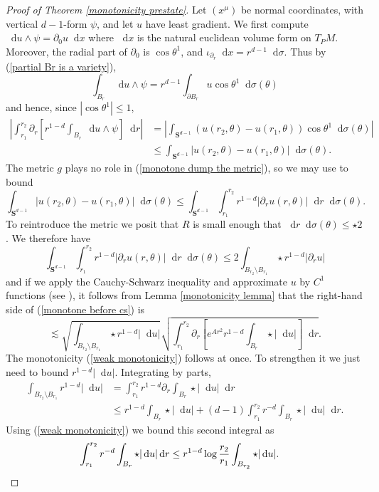 \documentclass[reqno,10pt]{amsart}
\newcommand{\Sph}{\mathbf S}
\newcommand*\dif{\mathop{}\!\mathrm{d}}
\theoremstyle{definition}
\numberwithin{equation}{section}
\begin{document}
\begin{proof}[Proof of Theorem \ref{monotonicity prestate}]
Let $(x^\mu)$ be normal coordinates, with vertical $d-1$-form $\psi$, and let $u$ have least gradient.
We first compute $\dif u \wedge \psi = \partial_0 u \dif x$
where $\dif x$ is the natural euclidean volume form on $T_PM$.
Moreover, the radial part of $\partial_0$ is $\cos \theta^1$, and $\iota_{\partial_r} \dif x = r^{d - 1} \dif \sigma$.
Thus by (\ref{partial Br is a variety}),
$$\int_{B_r} \dif u \wedge \psi = r^{d - 1}\int_{\partial B_r} u \cos \theta^1 \dif \sigma(\theta)$$
and hence, since $|\cos \theta^1| \leq 1$,
\begin{align}
\left|\int_{r_1}^{r_2} \partial_r \left[r^{1 - d}\int_{B_r} \dif u \wedge \psi\right] \dif r\right|
&= \left|\int_{\Sph^{d - 1}} (u(r_2, \theta) - u(r_1, \theta)) \cos \theta^1 \dif \sigma(\theta)\right| \\
&\leq \int_{\Sph^{d - 1}} |u(r_2, \theta) - u(r_1, \theta)| \dif \sigma(\theta). \label{monotone dump the metric}
\end{align}
The metric $g$ plays no role in (\ref{monotone dump the metric}), so we may use \cite[Lemma 5.3]{Giusti77} to bound
$$\int_{\Sph^{d - 1}} |u(r_2, \theta) - u(r_1, \theta)| \dif \sigma(\theta) \leq \int_{\Sph^{d - 1}} \int_{r_1}^{r_2} r^{1 - d}|\partial_r u(r, \theta)| \dif r \dif\sigma(\theta).$$
To reintroduce the metric we posit that $R$ is small enough that $\dif r \dif \sigma(\theta) \leq \star 2$.
We therefore have
\begin{equation}\label{monotone before cs}
\int_{\Sph^{d - 1}} \int_{r_1}^{r_2} r^{1 - d}|\partial_r u(r, \theta)| \dif r \dif\sigma(\theta) \leq 2 \int_{B_{r_2} \setminus B_{r_1}} \star r^{1 - d}|\partial_r u|
\end{equation}
and if we apply the Cauchy-Schwarz inequality and approximate $u$ by $C^1$ functions (see \cite[pg68]{Giusti77}), it follows from Lemma \ref{monotonicity lemma} that the right-hand side of (\ref{monotone before cs}) is
$$\lesssim \sqrt{\int_{B_{r_2} \setminus B_{r_1}} \star r^{1 - d} |\dif u|} \sqrt{\int_{r_1}^{r_2} \partial_r \left[e^{Ar^2} r^{1-d}\int_{B_r} \star |\dif u|\right] \dif r}.$$
The monotonicity (\ref{weak monotonicity}) follows at once. To strengthen it we just need to bound $r^{1 - d} |\dif u|$.
Integrating by parts,
\begin{align*}
\int_{B_{r_2} \setminus B_{r_1}} r^{1 - d} |\dif u| &= \int_{r_1}^{r_2} r^{1 - d} \partial_r \int_{B_r} \star |\dif u| \dif r \\
&\leq r^{1 - d} \int_{B_r} \star |\dif u| + (d - 1) \int_{r_1}^{r_2} r^{-d} \int_{B_r} \star |\dif u| \dif r.
\end{align*}
Using (\ref{weak monotonicity}) we bound this second integral as
\begin{align*}
\int_{r_1}^{r_2} r^{-d} \int_{B_r} \star |\dif u| \dif r &\leq r^{1 - d} \log \frac{r_2}{r_1} \int_{B_{r_2}} \star |\dif u|. \qedhere
\end{align*}
\end{proof}
\end{document}
